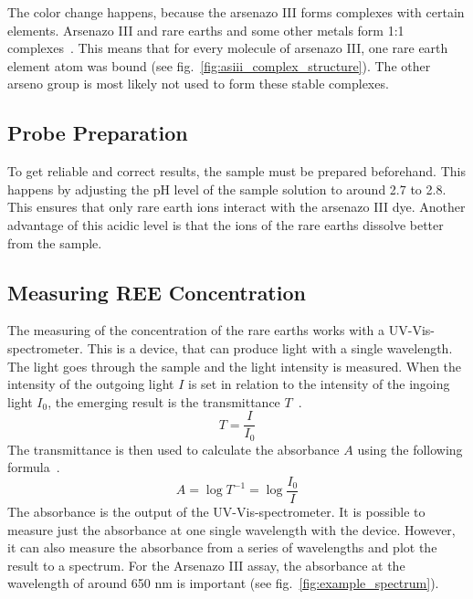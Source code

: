 The color change happens, because the arsenazo III forms complexes with certain elements.
Arsenazo III and rare earths and some other metals form 1:1 complexes~\cite{arsenazo3complex, arsenazo3structurecomplex}.
This means that for every molecule of arsenazo III, one rare earth element atom was bound (see fig.~\ref{fig:asiii_complex_structure}).
The other arseno group is most likely not used to form these stable complexes.


\subsection{Probe Preparation}
To get reliable and correct results, the sample must be prepared beforehand.
This happens by adjusting the pH level of the sample solution to around 2.7 to 2.8.
This ensures that only rare earth ions interact with the arsenazo III dye.
Another advantage of this acidic level is that the ions of the rare earths dissolve better from the sample.

\subsection{Measuring REE Concentration}
The measuring of the concentration of the rare earths works with a UV-Vis-spectrometer.
This is a device, that can produce light with a single wavelength.
The light goes through the sample and the light intensity is measured.
When the intensity of the outgoing light \(I\) is set in relation to the intensity of the ingoing light \(I_0\), the emerging result is the transmittance \(T\)~\cite{transmittanceformula}.
\[T=\frac{I}{I_0}\]
The transmittance is then used to calculate the absorbance \(A\) using the following formula~\cite{arbsorbanceformula}.
\[A=\log{T^{-1}}=\log{\frac{I_0}{I}}\]
The absorbance is the output of the UV-Vis-spectrometer.
It is possible to measure just the absorbance at one single wavelength with the device.
However, it can also measure the absorbance from a series of wavelengths and plot the result to a spectrum.
For the Arsenazo III assay, the absorbance at the wavelength of around 650 nm is important (see fig.~\ref{fig:example_spectrum}).

